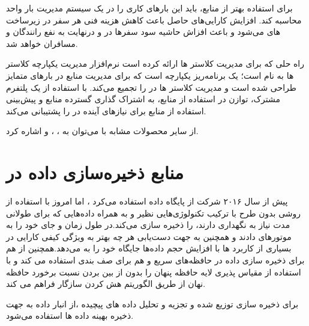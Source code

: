 برای استفاده بهتر از منابع، باید این بارهای کاری را در یک سیستم مدیریت بار واحد محاسبه کند. افزایش کارایی‌های حاصل باعث کاهش هزینه فنی هر سفر در زیرساخت های  می‌شود و باعث افزاش حاشیه سود سفر‌ها در  و درنهایت به نفع رانندگان و مسافران خواهد شد.

راه حلی که  برای مدیریت کلاستر ها ارائه کرده است نرم‌افزار مدیریت یکپارچه کلاستر ها به نام  است\cite{resource_uber}؛  یک برنامه‌ریز یکپارچه است که برای مدیریت منابع در بارهای متمایز طراحی شده است و مدیریت کلاستر ها در  را تجمیع می‌کند.  با استفاده از یک پلتفرم مشترک، توازن در استفاده از منابع، به اشتراک گذاری گسترده منابع و پیش‌بینی استفاده از منابع برای نیازهای آینده در  را پشتیبانی می‌کند.

از سایر محصولات مشابه با  می‌توان به \cite{verma2015large} ،\cite{kubernetes} ، \cite{hadoop} و \cite{aurora}\cite{mesos} اشاره کرد.

\section{منابع ذخیره‌سازی داده در }
پیش از سال ۲۰۱۶ شرکت  از پایگاه داده  استفاده می‌کرد \cite{migration_postgres}، اما امروز با استفاده از روشی بدون طرح\cite{schemaless}  با ترکیب تکنولوژی‌هایی نظیر \cite{riak} و \cite{cassandra} به همراه    داده‌هایی که برای طولانی مدت نیاز به نگهداری دارند، را ذخیره سازی می‌کند.در طول زمان  و  جای خود را به موتور‌‌های  دادند و همچنین به جهت دست‌یابی هر چه بهتر به ویژگی کیفی کارایی در بسیاری از کاربرد ها با افزایش حجم داده‌ها  جایگاه خود را به  می‌دهد.همچنین  از \cite{redis}  هم برای ذخیره سازی داده در حافظه‌های سریع و هم برای صف بندی استفاده می کند و با استفاده از \cite{Twemproxy} مقیاس پذیری لایه حافظه پنهان را بدون از بین بردن نسبت برخورد حافظه نهان از طریق الگوریتم هش کردن سازگار فراهم می کند.

برای ذخیره سازی توزیع شده و تجزیه و تحلیل داده های پیچیده ،از انبار داده \cite{hadoop} به جهت ذخیره بهینه داده ها استفاده می‌شود.

